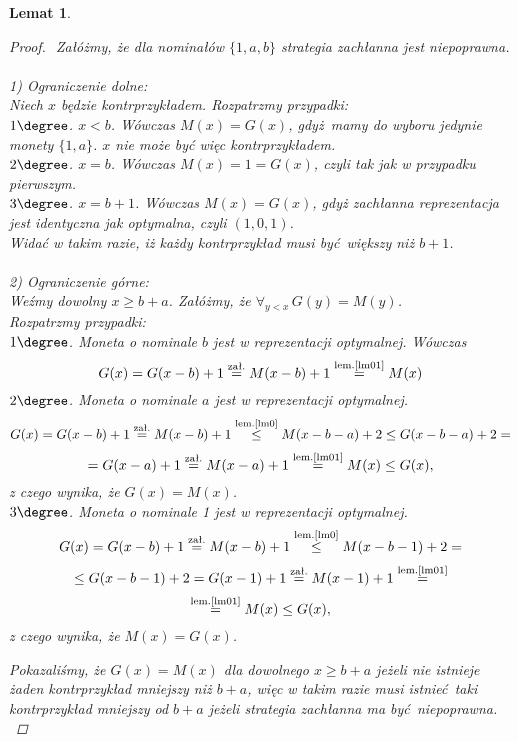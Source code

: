 \documentclass[12pt]{article}
\newtheorem{lemma}{Lemat}
\begin{document}
\begin{titlepage}
\begin{lemma}
\begin{proof}$ $\newline
Załóżmy, że dla nominałów $\{1, a, b\}$ strategia zachłanna jest niepoprawna.\\\\
1) Ograniczenie dolne:\\    
Niech $x$ będzie kontrprzykładem. Rozpatrzmy przypadki:\\
$1\degree$. $x < b$. Wówczas $M(x) = G(x)$, gdyż mamy do
wyboru jedynie monety $\{1, a\}$. $x$ nie może być więc kontrprzykładem.\\
$2\degree$. $x = b$. Wówczas $M(x) = 1 = G(x)$, czyli tak jak w przypadku pierwszym.\\
$3\degree$. $x = b + 1 $. Wówczas $M(x) = G(x)$, gdyż zachłanna reprezentacja jest
identyczna jak optymalna, czyli $(1, 0, 1)$.\\
Widać w takim razie, iż każdy kontrprzykład musi być większy niż $b + 1$.\\\\
2) Ograniczenie górne:\\
Weźmy dowolny $x \geq b + a$. Załóżmy, że $\forall_{y<x}\,G(y) = M(y)$.\\
Rozpatrzmy przypadki:\\
$1\degree$. Moneta o nominale $b$ jest w reprezentacji optymalnej.
Wówczas
$$G(x) = G(x-b) + 1 \stackrel{\text{zał.}}{=} M(x-b) + 1 \stackrel{\text{lem.\ref{lm01}}}{=} M(x)$$
$2\degree$. Moneta o nominale $a$ jest w reprezentacji optymalnej.\\
$$G(x) = G(x-b) + 1 \stackrel{\text{zał.}}{=} M(x-b) + 1 
\stackrel{\text{lem.\ref{lm0}}}{\leq} M(x-b-a) + 2 \leq G(x-b-a) + 2=$$
$$= G(x-a) + 1 \stackrel{\text{zał.}}{=} M(x-a) + 1 \stackrel{\text{lem.\ref{lm01}}}{=} M(x) \leq G(x),$$
z czego wynika, że $G(x) = M(x)$.\\
$3\degree$. Moneta o nominale 1 jest w reprezentacji optymalnej.\\
$$G(x) = G(x-b) + 1 \stackrel{\text{zał.}}{=} M(x-b)+1 \stackrel{\text{lem.\ref{lm0}}}{\leq} M(x-b-1)+2 = $$
$$ \leq G(x-b-1) + 2 = G(x-1) + 1 \stackrel{\text{zał.}}{=} M(x-1) + 1 \stackrel{\text{lem.\ref{lm01}}}{=} $$
$$ \stackrel{\text{lem.\ref{lm01}}}{=} M(x) \leq G(x),$$
z czego wynika, że $M(x) = G(x)$.

Pokazaliśmy, że $G(x) = M(x)$ dla dowolnego $x \geq b + a$ jeżeli nie istnieje żaden kontrprzykład mniejszy
niż $b + a$, więc w takim razie musi istnieć taki kontrprzykład mniejszy od
$b + a$ jeżeli strategia zachłanna ma być niepoprawna.\\


\end{proof}
\end{lemma}
\end{titlepage}
\end{document}

